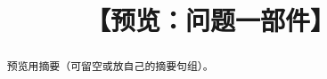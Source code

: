 \documentclass[withoutpreface,bwprint]{cumcmthesis}
\title{【预览：问题一部件】}
\begin{document}
\maketitle

\begin{abstract}
    预览用摘要（可留空或放自己的摘要句组）。
\end{abstract}


\end{document}
